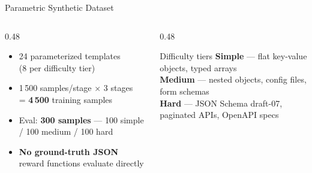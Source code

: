 \documentclass[10pt, aspectratio=169]{beamer}
\begin{document}
\begin{frame}{Parametric Synthetic Dataset}
  \begin{columns}[T]
    \begin{column}{0.48\textwidth}
      \begin{itemize}
        \setlength\itemsep{0.55em}
        \item 24 parameterized templates\\(8 per difficulty tier)
        \item 1\,500 samples/stage $\times$ 3 stages\\
              = \textbf{4\,500} training samples
        \item Eval: \textbf{300 samples} — 100 simple / 100 medium / 100 hard
        \item \textbf{No ground-truth JSON}\\
              reward functions evaluate directly
      \end{itemize}
    \end{column}
    \begin{column}{0.48\textwidth}
      \begin{block}{Difficulty tiers}
        \small
        \textbf{Simple} — flat key-value objects, typed arrays\\[0.4em]
        \textbf{Medium} — nested objects, config files, form schemas\\[0.4em]
        \textbf{Hard} — JSON Schema draft-07, paginated APIs, OpenAPI specs
      \end{block}
    \end{column}
  \end{columns}
\end{frame}

\end{document}
